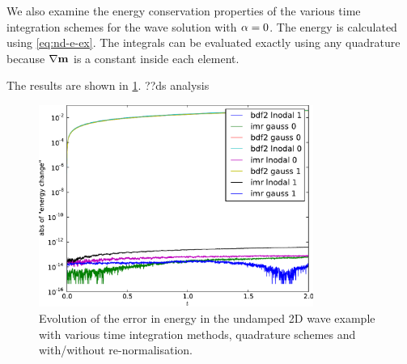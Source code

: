 

We also examine the energy conservation properties of the various time integration schemes for the wave solution with $\alpha = 0$.
The energy is calculated using \cref{eq:nd-e-ex}.
The integrals can be evaluated exactly using any quadrature because $\nabla \boldsymbol{\mathrm{m}}$ is a constant inside each element.

The results are shown in \cref{fig:energy-error-2d}.
??ds analysis

\begin{figure}
  \centering
  \includegraphics[width=0.8\textwidth]{plots/2d_wave_solution_energy/absofenergychangevstimes}
  \caption{Evolution of the error in energy in the undamped 2D wave example with various time integration methods, quadrature schemes and with/without re-normalisation.}
  \label{fig:energy-error-2d}
\end{figure}



